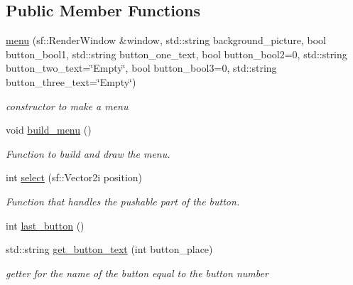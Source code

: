 \subsection*{Public Member Functions}
\begin{DoxyCompactItemize}
\item 
\hyperlink{classmenu_a1c6f1319ba2123f9654df695725e83b4}{menu} (sf\+::\+Render\+Window \&window, std\+::string background\+\_\+picture, bool button\+\_\+bool1, std\+::string button\+\_\+one\+\_\+text, bool button\+\_\+bool2=0, std\+::string button\+\_\+two\+\_\+text=\char`\"{}Empty\char`\"{}, bool button\+\_\+bool3=0, std\+::string button\+\_\+three\+\_\+text=\char`\"{}Empty\char`\"{})
\begin{DoxyCompactList}\small\item\em constructor to make a menu \end{DoxyCompactList}\item 
void \hyperlink{classmenu_a8d194b462b1b180086e5b06a2dbfbdff}{build\+\_\+menu} ()
\begin{DoxyCompactList}\small\item\em Function to build and draw the menu. \end{DoxyCompactList}\item 
int \hyperlink{classmenu_a06744d58a2aad693d3637d0485aa7984}{select} (sf\+::\+Vector2i position)
\begin{DoxyCompactList}\small\item\em Function that handles the pushable part of the button. \end{DoxyCompactList}\item 
int \hyperlink{classmenu_ab572ef3baf462b15322e37278d81494c}{last\+\_\+button} ()
\item 
std\+::string \hyperlink{classmenu_aa4b8f6e9c87b8fa413a830af33429c85}{get\+\_\+button\+\_\+text} (int button\+\_\+place)
\begin{DoxyCompactList}\small\item\em getter for the name of the button equal to the button number \end{DoxyCompactList}\end{DoxyCompactItemize}
